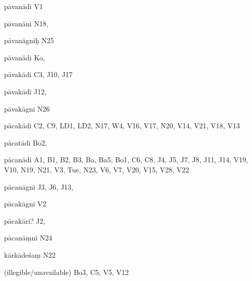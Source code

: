 \begin{ekdosis}
\begin{marma}[hp01_055]
\begin{marma}[hp02_009]
\begin{marma}[hp02_011]
      \begin{marma}[hp02_35a]
      \item[pāvanādi] V1
      \item[pāvanāni] N18,
      \item[pāvanāgniḥ] N25
      \item[pāvanādi] Ko,
      \item[pāvakādi] C3, J10, J17
      \item[pāvakādī] J12,
      \item[pāvakāgni] N26
      \item[pācakādi] C2, C9, LD1, LD2, N17, W4, V16, V17, N20, V14, V21, V18, V13
      \item[pācatādi] Bo2, 
      \item[pācanādi] A1, B1, B2, B3, Ba, Ba5, Bo1, C6, C8, J4, J5, J7, J8, J11, J14, V19, V10, N19, N21, V3, Tue, N23, V6, V7, V20, V15, V28, V22
      \item[pācanāgni] J3, J6, J13,  
      \item[pācakāgni] V2
      \item[pācakāri?] J2,
      \item[pācanāṃnī] N24
      \item[kārkādeśaṃ] N22
      \item[(illegible/unavailable)] Bo3, C5, V5, V12
        \begin{description}

        \end{description}
      \end{marma}


\end{marma}
\end{marma}
\end{marma}
\end{ekdosis}
